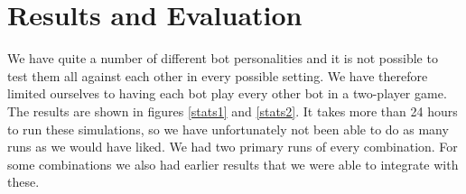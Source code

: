 \section{Results and Evaluation}



We have quite a number of different bot personalities and it is not
possible to test them all against each other in every possible
setting. We have therefore limited ourselves to having each bot play
every other bot in a two-player game. The results are shown in figures
\ref{stats1} and \ref{stats2}. It takes more than 24 hours to run
these simulations, so we have unfortunately not been able to do as
many runs as we would have liked. We had two primary runs of every
combination. For some combinations we also had earlier results that we
were able to integrate with these.

